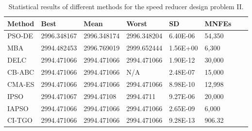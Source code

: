 
\begin{table*}[tp]
    \tiny
    \begin{center}
    
    \begin{tabular}{ P{2.0cm} P{2.0cm} P{2.0cm} P{2.0cm} P{2.0cm} P{2.0cm} P{2.0cm} P{2.0cm}  }
    \hline
    \textbf{Method} & \textbf{Best} & \textbf{Mean} & \textbf{Worst} & \textbf{SD} & \textbf{MNFEs} \\
    \hline
    
    PSO-DE & 2996.348167 & 2996.348174 & 2996.348204 & 6.40E-06 & 54,350 \\
    MBA & 2994.482453 & 2996.769019 & 2999.652444 & 1.56E+00 & 6,300 \\
    DELC & 2994.471066 & 2994.471066 & 2994.471066 & 1.90E-12 & 30,000 \\
    CB-ABC & 2994.471066 & 2994.471066 & N/A & 2.48E-07 & 15,000 \\
    CMA-ES & 2994.471066 & 2994.471066 & 2994.471066 & 8.98E-10 & 12,998 \\
    IPSO & 2994.471067 & 2994.47108 & 2994.4711 & 9.27E-06 & 20,000 \\
    IAPSO & 2994.471066 & 2994.471066 & 2994.471066 & 2.65E-09 & 6,000 \\
    CI-TGO & 2994.471066 & 2994.471066 & 2994.471066 & 9.28E-13 & 906.32 \\ 
    
  

    \hline
    \end{tabular}
    \end{center}
    
    \caption{ Statistical results of different methods for the speed reducer design problem II. \\[1em]}
    \label{tab:SP2}
    \end{table*}
    
    